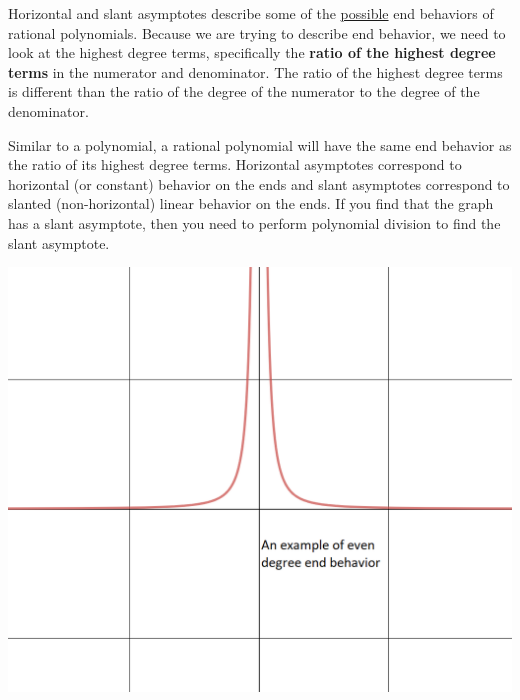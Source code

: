 \begin{info}
Horizontal and slant asymptotes describe some of the \underline{possible} end behaviors of rational polynomials. Because we are trying to describe end behavior, we need to look at the highest degree terms, specifically the \textbf{ratio of the highest degree terms} in the numerator and denominator. The ratio of the highest degree terms is different than the ratio of the degree of the numerator to the degree of the denominator.

Similar to a polynomial, a rational polynomial will have the same end behavior as the ratio of its highest degree terms. Horizontal asymptotes correspond to horizontal (or constant) behavior on the ends and slant asymptotes correspond to slanted (non-horizontal) linear behavior on the ends. If you find that the graph has a slant asymptote, then you need to perform polynomial division to find the slant asymptote.

\begin{center}
\includegraphics[scale=.35]{even_horiz_asymp_example.png}


\end{center}
\end{info}
